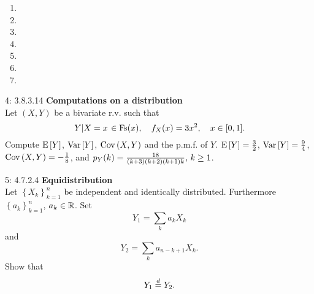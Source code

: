 \documentclass[a4paper,twoside=false,abstract=false,numbers=noenddot,
titlepage=false,headings=small,parskip=half,version=last]{scrartcl}
\begin{document}
\begin{solution}
    \begin{enumerate}
        \item
        \item
        \item
        \item
        \item
        \item
        \item
    \end{enumerate}
\end{solution}
\pagebreak

\begin{exercise}{4: 3.8.3.14} \textbf{Computations on a distribution} \\
    Let $(X,Y)$ be a bivariate r.v. such that
    \begin{equation}
        \left. Y \middle\vert X=x \right. \in \text{Fs}(x),\quad
        f_X(x)=3x^2,\quad
        x\in [0, 1].
    \end{equation}
    Compute ${\rm E}\,[Y]$, ${\rm Var}\,[Y]$, ${\rm Cov}\,(X, Y)$ and the p.m.f.
    of $Y$.
    \Answer
    ${{\rm E}\,[Y]=\frac{3}{2}}$,
    ${{\rm Var}\,[Y]=\frac{9}{4}}$,
    ${{\rm Cov}\,(X,Y)=-\frac{1}{8}}$, and
    $p_{Y} (k) = \frac{18}{(k+3)(k+2)(k+1)k},\, k \ge 1$.

\end{exercise}
\begin{solution}

\end{solution}
\pagebreak

\begin{exercise}{5: 4.7.2.4} \textbf{Equidistribution} \\
    Let $\left\{{X_k}\right\}_{k=1}^n$ be independent and identically
    distributed. Furthermore $\left\{{a_k}\right\}_{k=1}^n$, $a_k \in \mathbb{R}$. Set
    \begin{equation}
        Y_1 = \sum\limits_k a_k X_k
    \end{equation}
    and
    \begin{equation}
        Y_2 = \sum\limits_k a_{n-k+1} X_k.
    \end{equation}
    Show that
    \begin{equation}
        Y_1 \stackrel{d}{=} Y_2.
    \end{equation}
\end{exercise}
\begin{solution}
\end{solution}
\pagebreak
\end{document}
